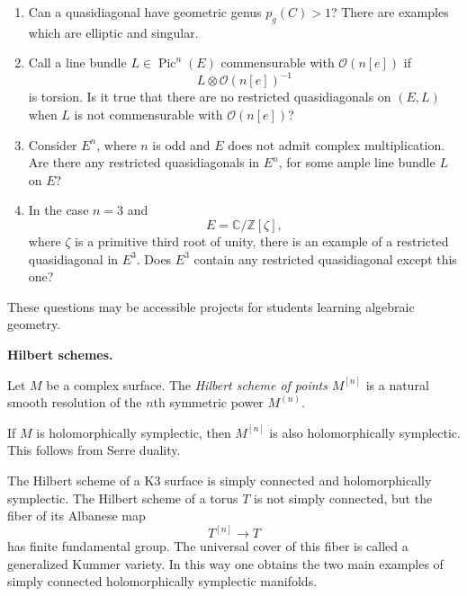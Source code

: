 \begin{enumerate}
\item Can a quasidiagonal have
geometric genus $p_g(C)>1$?
There are examples which are elliptic
and singular.

\item Call a line bundle
$L\in\operatorname{Pic}^n(E)$
commensurable with
$\mathcal{O}(n[e])$ if
\[
L\otimes\mathcal{O}(n[e])^{-1}
\]
is torsion.
Is it true that there are no
restricted quasidiagonals on $(E,L)$
when $L$ is not commensurable with
$\mathcal{O}(n[e])$?

\item Consider $E^n$, where $n$ is
odd and $E$ does not admit complex
multiplication.
Are there any restricted
quasidiagonals in $E^n$, for some
ample line bundle $L$ on $E$?

\item In the case $n=3$ and
\[
E=\mathbb{C}/\mathbb{Z}[\zeta],
\]
where $\zeta$ is a primitive third
root of unity, there is an example of
a restricted quasidiagonal in $E^3$.
Does $E^3$ contain any restricted
quasidiagonal except this one?
\end{enumerate}

\begin{remark}
\label{remark-questions-may}
These questions may be accessible
projects for students learning
algebraic geometry.
\end{remark}

\medskip\noindent
{\bf Hilbert schemes.}

\begin{definition}
\label{definition-let-m4}
Let $M$ be a complex surface.
The {\it Hilbert scheme of points}
$M^{[n]}$
is a natural smooth resolution of the
$n$th symmetric power $M^{(n)}$.
\end{definition}

\begin{remark}
\label{remark-m-holomorphically}
If $M$ is holomorphically symplectic,
then $M^{[n]}$ is also
holomorphically symplectic.
This follows from Serre duality.
\end{remark}

\begin{remark}
\label{remark-hilbert-scheme}
The Hilbert scheme of a K3 surface is
simply connected and holomorphically
symplectic.
The Hilbert scheme of a torus $T$ is
not simply connected, but the fiber of
its Albanese map
\[
T^{[n]}\to T
\]
has finite fundamental group.
The universal cover of this fiber is
called a generalized Kummer variety.
In this way one obtains the two main
examples of simply connected
holomorphically symplectic manifolds.
\end{remark}

